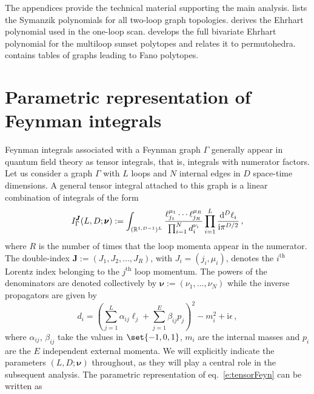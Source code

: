 \documentclass[12pt,a4paper]{article}
\theoremstyle{plain}
\theoremstyle{remark}
\newcommand{\nprops}{N}
\newcommand{\eexternal}{E}
\newcommand{\rrank}{R}
\newcommand{\dd}{\mathrm{d}}
\newcommand{\undernotation}[1]{\pmb{#1}}
\newcommand{\ii}{\mathrm{i}}
\begin{document}
The appendices provide the technical material supporting the main analysis. 
 lists the Symanzik polynomials for all two-loop graph topologies. 
 derives the Ehrhart polynomial used in the one-loop scan. 
 develops the full bivariate Ehrhart polynomial for the multiloop sunset polytopes and relates it to permutohedra. 
 contains  tables of graphs leading to Fano polytopes. 
	
	\section{Parametric representation of Feynman integrals}\label{sec:finite}
	
\newcommand{\prefactorGamma}{\Upgamma}	
	Feynman integrals associated with a Feynman graph $\Gamma$ generally appear in quantum field theory as tensor integrals, that is,  integrals with numerator factors. Let us consider a graph  $\Gamma$ with $L$ loops and $\nprops$ internal edges in $D$ space-time dimensions. 
	A general tensor integral attached to this graph is a linear combination of integrals of the form 
	\newcommand{\multiJ}{\undernotation{J}}
    \begin{equation}\label{e:tensorFeyn}
		I_\Gamma^{\multiJ}(L,D;\undernotation{\nu}):= \int_{(\mathbb R^{1,D-1})^L}{\ell_{j_1}^{\mu_1}\cdots
			\ell_{j_R}^{\mu_R}\over \prod_{i=1}^{\nprops} d_i^{\nu_i} }
		\prod_{i=1}^L \frac{  \dd^D\ell_i }{\ii \pi^{D/2} }\,,
	\end{equation}
	where $\rrank$ is the number of times that the loop momenta appear in the numerator. 
    The double-index  $\multiJ:=(J_1, J_2, \dots, J_R)$,  with  $J_i=(j_i,\mu_i)$, denotes the $i^{\mathrm{th}}$ Lorentz index belonging to the $j^{\mathrm{th}}$ loop momentum. The powers of the denominators are denoted collectively by $\undernotation{\nu} :=(\nu_1,\dots,\nu_{\nprops})$ while the inverse propagators are given by 
	\begin{equation}
		d_i=
		\left( \sum_{j=1}^L \alpha_{ij} \ell_j+\sum_{j=1}^{\eexternal} \beta_{ij}p_j \right)^2-m_i^2+\ii \epsilon\,, 
        \label{denominators}
	\end{equation}
	where
	$\alpha_{ij}$, $\beta_{ij}$ take the values in  $\set{-1,0,1}$, $m_i$ are the  internal masses and $p_i$ are the $E$ independent
	external momenta. We will explicitly indicate  the parameters $(L,D;\undernotation{\nu})$ throughout, as they   will play a central role in the subsequent analysis.
	The parametric representation  of eq.~\eqref{e:tensorFeyn}  can be written as~\cite{Heinrich:2008si} 
\end{document}
